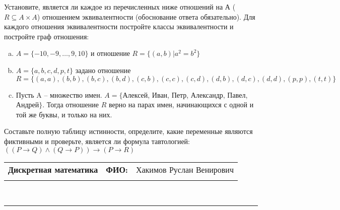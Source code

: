 \documentclass[10pt]{exam}
\newcommand{\class}{Дискретная математика}
\newcommand{\examdate}{}
\begin{document}
\begin{questions}
\question
Установите, является ли каждое из перечисленных ниже отношений на А ($R \subseteq A \times A$) отношением эквивалентности (обоснование ответа обязательно). Для каждого отношения эквивалентности постройте классы 
эквивалентности и постройте граф отношения:
\begin{enumerate} [a)]\setcounter{enumi}{0}
\item $A = \{-10, -9, … , 9, 10\}$ и отношение $R = \{(a,b)|a^{2} = b^{2}\}$
\item $A = \{a, b, c, d, p, t\}$ задано отношение $R = \{(a, a), (b, b), (b, c), (b, d), (c, b), (c, c), (c, d), (d, b), (d, c), (d, d), (p,p), (t,t)\}$
\item Пусть A – множество имен. $A = \{ $Алексей, Иван, Петр, Александр, Павел, Андрей$ \}$. Тогда отношение $R$ верно на парах имен, начинающихся с одной и той же буквы, и только на них.
\end{enumerate}\question Составьте полную таблицу истинности, определите, какие переменные являются фиктивными и проверьте, является ли формула тавтологией:
$(( P \rightarrow Q) \land (Q \rightarrow P)) \rightarrow (P \rightarrow R)$

\end{questions}
\newpage
\begin{flushright}
\begin{tabular}{p{2.8in} r l}
\textbf{\class} & \textbf{ФИО:} &Хакимов Руслан Венирович
\\

\textbf{\examdate} &&\\
\end{tabular}\\
\end{flushright}
\rule[1ex]{\textwidth}{.1pt}
\end{document}
